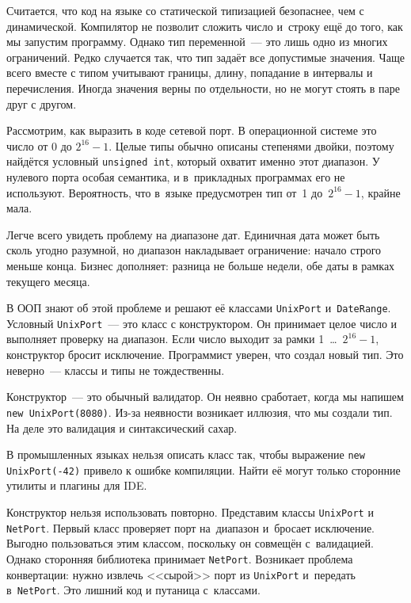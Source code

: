 
Считается, что код на языке со статической типизацией безопаснее, чем с
динамической. Компилятор не позволит сложить число и~строку ещё до того, как
мы запустим программу. Однако тип переменной~--- это лишь одно из многих
ограничений. Редко случается так, что тип задаёт все допустимые
значения. Чаще всего вместе с типом учитывают границы, длину, попадание в
интервалы и перечисления. Иногда значения верны по отдельности, но не могут
стоять в паре друг с другом.


Рассмотрим, как выразить в коде сетевой порт. В операционной системе это число
от 0 до $2^{16}-1$. Целые типы обычно описаны степенями двойки, поэтому найдётся
условный \verb|unsigned int|, который охватит именно этот диапазон. У нулевого
порта особая семантика, и в~прикладных программах его не используют.
Вероятность, что в~языке предусмотрен тип от~1 до~$2^{16}-1$, крайне мала.

Легче всего увидеть проблему на диапазоне дат. Единичная дата может быть сколь
угодно разумной, но диапазон накладывает ограничение: начало строго меньше
конца. Бизнес дополняет: разница не больше недели, обе даты в рамках текущего
месяца.


В ООП знают об этой проблеме и решают её классами \verb|UnixPort|
и~\verb|DateRange|. Условный \verb|UnixPort|~--- это класс с конструктором. Он
принимает целое число и выполняет проверку на диапазон. Если число выходит за
рамки 1~\dots~$2^{16}-1$, конструктор бросит исключение. Программист уверен, что
создал новый тип. Это неверно~--- классы и типы не тождественны.

Конструктор~--- это обычный валидатор. Он неявно сработает, когда мы напишем
\verb|new UnixPort(8080)|. Из-за неявности возникает иллюзия, что мы создали
тип. На деле это валидация и синтаксический сахар.


В промышленных языках нельзя описать класс так, чтобы выражение
\verb|new UnixPort(-42)| привело к ошибке компиляции. Найти её могут
только сторонние утилиты и плагины для IDE.

Конструктор нельзя использовать повторно. Представим классы \verb|UnixPort| и
\verb|NetPort|. Первый класс проверяет порт на~диапазон и~бросает
исключение. Выгодно пользоваться этим классом, поскольку он совмещён
с~валидацией. Однако сторонняя библиотека принимает \verb|NetPort|. Возникает
проблема конвертации: нужно извлечь <<сырой>> порт из \verb|UnixPort|
и~передать в~\verb|NetPort|. Это лишний код и путаница с~классами.

